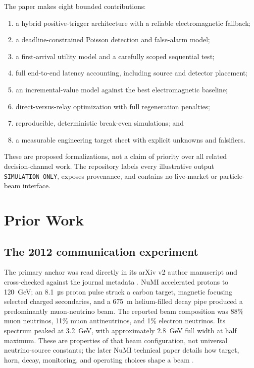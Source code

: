 \documentclass[11pt]{article}
\newcommand{\simonly}{\texttt{SIMULATION\_ONLY}}
\begin{document}
The paper makes eight bounded contributions:

\begin{enumerate}[leftmargin=*]
  \item a hybrid positive-trigger architecture with a reliable electromagnetic fallback;
  \item a deadline-constrained Poisson detection and false-alarm model;
  \item a first-arrival utility model and a carefully scoped sequential test;
  \item full end-to-end latency accounting, including source and detector placement;
  \item an incremental-value model against the best electromagnetic baseline;
  \item direct-versus-relay optimization with full regeneration penalties;
  \item reproducible, deterministic break-even simulations; and
  \item a measurable engineering target sheet with explicit unknowns and falsifiers.
\end{enumerate}

These are proposed formalizations, not a claim of priority over all related decision-channel work. The repository labels every illustrative output \simonly, exposes provenance, and contains no live-market or particle-beam interface.

\section{Prior Work}

\subsection{The 2012 communication experiment}

The primary anchor was read directly in its arXiv v2 author manuscript and cross-checked against the journal metadata \citep{Stancil2012}. NuMI accelerated protons to \SI{120}{\giga\electronvolt}; an \SI{8.1}{\micro\second} proton pulse struck a carbon target, magnetic focusing selected charged secondaries, and a \SI{675}{\metre} helium-filled decay pipe produced a predominantly muon-neutrino beam. The reported beam composition was 88\% muon neutrinos, 11\% muon antineutrinos, and 1\% electron neutrinos. Its spectrum peaked at \SI{3.2}{\giga\electronvolt}, with approximately \SI{2.8}{\giga\electronvolt} full width at half maximum. These are properties of that beam configuration, not universal neutrino-source constants; the later NuMI technical paper details how target, horn, decay, monitoring, and operating choices shape a beam \citep{Adamson2016}.
\end{document}

